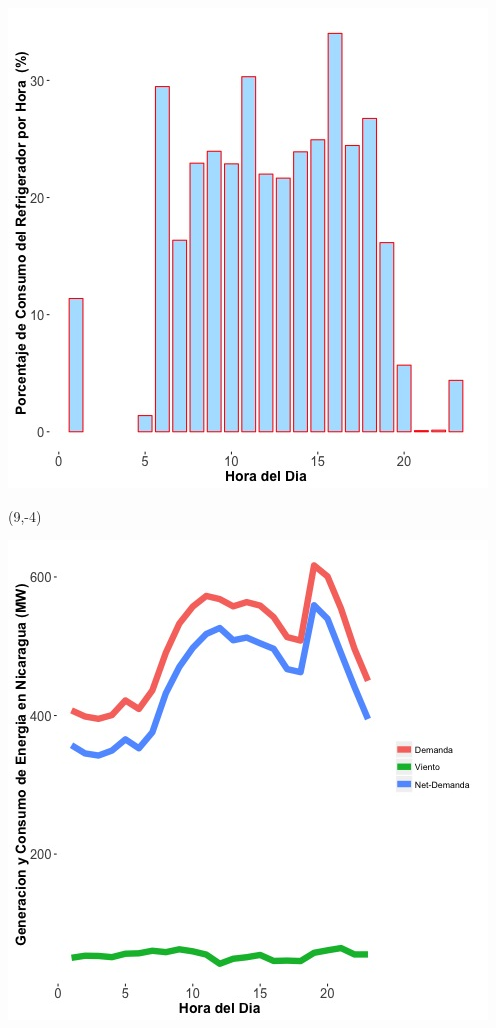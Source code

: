 \documentclass{article}\usepackage[]{graphicx}\usepackage[]{color}
\newenvironment{knitrout}{}{} %
\begin{document}
\begin{knitrout}
\color{fgcolor}
\includegraphics[scale=0.65]{figure/A25_fridge_energy_pct.jpg} 
\end{knitrout}

 \begin{textblock}{1}(9,-4)
\begin{minipage}{20em}
\begingroup

\endgroup
\end{minipage}
\end{textblock}

\vspace{20cm}

\begin{knitrout}
\color{fgcolor}
\includegraphics[scale=0.65]{figure/gridplot1.jpg} 
\end{knitrout}
\end{document}

